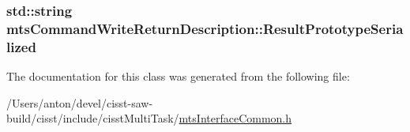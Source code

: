 \subsubsection[{Result\+Prototype\+Serialized}]{\setlength{\rightskip}{0pt plus 5cm}std\+::string mts\+Command\+Write\+Return\+Description\+::\+Result\+Prototype\+Serialized}\label{classmts_command_write_return_description_a37e964f55fdfe2df9b64d3e5767aa23b}


The documentation for this class was generated from the following file\+:\begin{DoxyCompactItemize}
\item 
/\+Users/anton/devel/cisst-\/saw-\/build/cisst/include/cisst\+Multi\+Task/\hyperlink{mts_interface_common_8h}{mts\+Interface\+Common.\+h}\end{DoxyCompactItemize}
